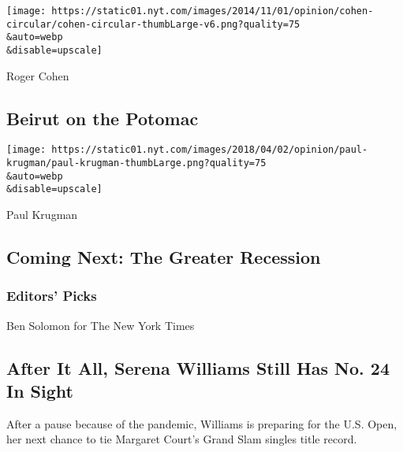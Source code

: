\href{/2020/08/07/opinion/beirut-explosion.html}{}

\texttt{[image: https://static01.nyt.com/images/2014/11/01/opinion/cohen-circular/cohen-circular-thumbLarge-v6.png?quality=75\\\&auto=webp\\\&disable=upscale]}

Roger Cohen

\hypertarget{beirut-on-the-potomac}{%
\subsection{Beirut on the Potomac}\label{beirut-on-the-potomac}}

\href{/2020/08/06/opinion/coronavirus-us-recession.html}{}

\texttt{[image: https://static01.nyt.com/images/2018/04/02/opinion/paul-krugman/paul-krugman-thumbLarge.png?quality=75\\\&auto=webp\\\&disable=upscale]}

Paul Krugman

\hypertarget{coming-next-the-greater-recession}{%
\subsection{Coming Next: The Greater
Recession}\label{coming-next-the-greater-recession}}

\hypertarget{editors-picks}{%
\subsubsection{Editors' Picks}\label{editors-picks}}

\href{/2020/08/07/sports/tennis/serena-williams-us-open.html}{}

Ben Solomon for The New York Times

\href{/2020/08/07/sports/tennis/serena-williams-us-open.html}{}

\hypertarget{after-it-all-serena-williams-still-has-no-24-in-sight}{%
\subsection{After It All, Serena Williams Still Has No. 24 In
Sight}\label{after-it-all-serena-williams-still-has-no-24-in-sight}}

After a pause because of the pandemic, Williams is preparing for the
U.S. Open, her next chance to tie Margaret Court's Grand Slam singles
title record.

\href{/2020/08/08/science/coronavirus-spread-air-conditioning.html}{}

